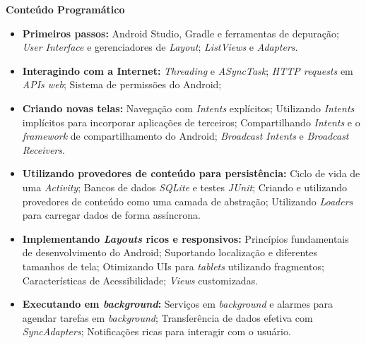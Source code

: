 \begin{snugshade}\begin{center}\textbf{
    Conteúdo Programático
}\end{center}\end{snugshade}

\begin{itemize}

\item \textbf{Primeiros passos:}
    Android Studio, Gradle e ferramentas de depuração;
    \textit{User Interface} e gerenciadores de \textit{Layout};
    \textit{ListViews} e \textit{Adapters}.

\item \textbf{Interagindo com a Internet:}
    \textit{Threading} e \textit{ASyncTask};
    \textit{HTTP requests} em \textit{APIs web};
    Sistema de permissões do Android;

\item \textbf{Criando novas telas:}
    Navegação com \textit{Intents} explícitos;
    Utilizando \textit{Intents} implícitos para incorporar aplicações de terceiros;
    Compartilhando \textit{Intents} e o \textit{framework} de compartilhamento do Android;
    \textit{Broadcast Intents} e  \textit{Broadcast Receivers}.

\item \textbf{Utilizando provedores de conteúdo para persistência:}
    Ciclo de vida de uma \textit{Activity};
    Bancos de dados \textit{SQLite} e testes \textit{JUnit};
    Criando e utilizando provedores de conteúdo como uma camada de abstração;
    Utilizando \textit{Loaders} para carregar dados de forma assíncrona.
    

\item \textbf{Implementando \textit{Layouts} ricos e responsivos:}
    Princípios fundamentais de desenvolvimento do Android;
    Suportando localização e diferentes tamanhos de tela;
    Otimizando UIs para \textit{tablets} utilizando fragmentos;
    Características de Acessibilidade;
    \textit{Views} customizadas.

\item \textbf{Executando em \textit{background}:}
    Serviços em \textit{background} e alarmes para agendar tarefas em \textit{background};
    Transferência de dados efetiva com \textit{SyncAdapters};
    Notificações ricas para interagir com o usuário.

\end{itemize}


